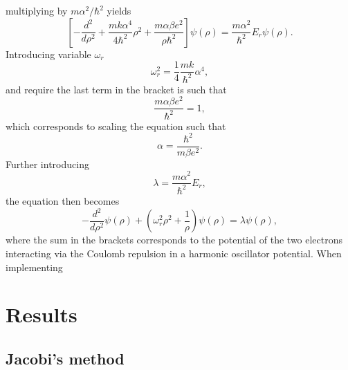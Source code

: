 \documentclass{emulateapj}
\begin{document}
%
multiplying by $m\alpha^2/\hbar^2$ yields
%
\begin{equation*}
    \left[-\frac{d^2}{d\rho^2} + \frac{mk\alpha^4}{4\hbar^2}\rho^2 + \frac{m\alpha\beta e^2}{\rho\hbar^2} \right]\psi(\rho) = \frac{m\alpha^2}{\hbar^2} E_r\psi(\rho).
\end{equation*}
%
Introducing variable $\omega_r$
%
\begin{equation*}
    \omega_r^2 = \frac{1}{4}\frac{mk}{\hbar^2}\alpha^4,
\end{equation*}
and require the last term in the bracket is such that
%
\begin{equation*}
    \frac{m\alpha \beta e^2}{\hbar^2} = 1,
\end{equation*}
%
which corresponds to scaling the equation such that
%
\begin{equation*}
     \alpha = \frac{\hbar^2}{m\beta e^2}.
\end{equation*}
%
Further introducing
%
\begin{equation*}
    \lambda = \frac{m\alpha^2}{\hbar^2}E_r,
\end{equation*}
%
the equation then becomes
%
\begin{equation*}
    -\frac{d^2}{d\rho^2}\psi(\rho) + \left(\omega_r^2\rho^2 + \frac{1}{\rho}\right)\psi(\rho) = \lambda \psi(\rho),
\end{equation*}
%
where the sum in the brackets corresponds to the potential of the two electrons interacting via the Coulomb repulsion in a harmonic oscillator potential. When implementing 

\section{Results}
\label{sec:results}

\subsection{Jacobi's method}
\end{document}
